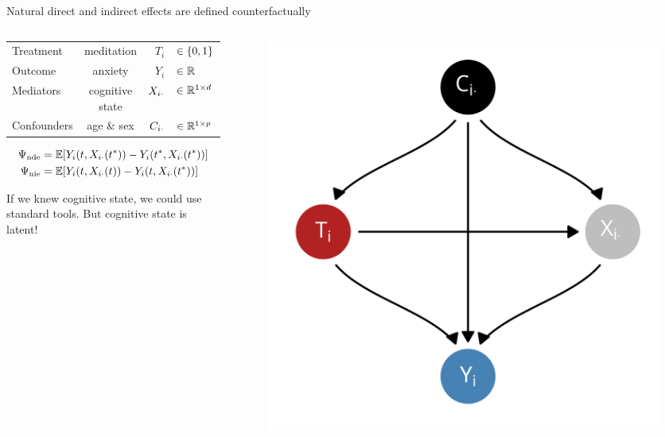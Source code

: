 \documentclass[aspectratio=169]{beamer}
\theoremstyle{remark}
\begin{document}
\begin{frame}{Natural direct and indirect effects are defined counterfactually}
    \begin{columns}
        \begin{column}{0.67 \textwidth}
            \begin{table}[]
                \begin{tabular}{lcrl}
                    Treatment   & meditation      & $T_i$          & $\in \{0, 1\} $     \\
                    Outcome     & anxiety         & $Y_i$          & $\in \mathbb{R}$              \\
                    Mediators   & cognitive state & $X_{i \cdot}$ & $\in \mathbb{R}^{1 \times d}$ \\
                    Confounders & age \& sex      & $C_{i \cdot}$ & $\in \mathbb{R}^{1 \times p}$
                \end{tabular}
            \end{table}
            \begin{align*}
                \nde & = \E{Y_i (t, \X_{i \cdot}(t^*)) - Y_i (t^*, \X_{i \cdot} (t^*))} \\
                \nie & = \E{Y_i (t, \X_{i \cdot}(t)) - Y_i (t, \X_{i \cdot} (t^*))}
            \end{align*}

            If we knew cognitive state, we could use standard tools. But cognitive state is latent!
        \end{column}
        \begin{column}{0.33 \textwidth}
            \centering
            \begin{figure}[ht]
                \includegraphics[width=\textwidth]{figures/dags/mediating.png}
                \centering
            \end{figure}
        \end{column}
    \end{columns}
\end{frame}
\end{document}
